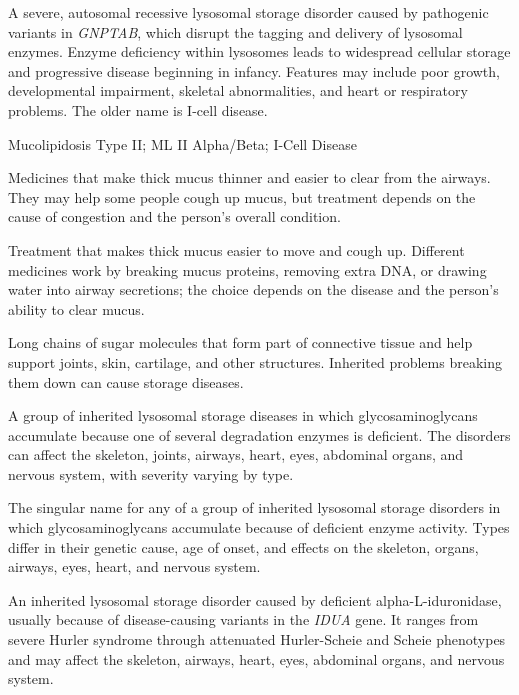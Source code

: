  A severe, autosomal recessive lysosomal
storage disorder caused by pathogenic variants in \textit{GNPTAB}, which
disrupt the tagging and delivery of lysosomal enzymes. Enzyme deficiency
within lysosomes leads to widespread cellular storage and progressive disease
beginning in infancy. Features may include poor growth, developmental
impairment, skeletal abnormalities, and heart or respiratory problems. The
older name is I-cell disease.

\synonyms
Mucolipidosis Type II; ML II Alpha/Beta; I-Cell Disease

 Medicines that make thick mucus thinner and easier to clear from the airways. They may help some people cough up mucus, but treatment depends on the cause of congestion and the person's overall condition.

 Treatment that makes thick mucus easier to move and cough up. Different medicines work by breaking mucus proteins, removing extra DNA, or drawing water into airway secretions; the choice depends on the disease and the person's ability to clear mucus.

 Long chains of sugar molecules that form part of connective tissue and help support joints, skin, cartilage, and other structures. Inherited problems breaking them down can cause storage diseases.

 A group of inherited lysosomal storage diseases in which glycosaminoglycans accumulate because one of several degradation enzymes is deficient. The disorders can affect the skeleton, joints, airways, heart, eyes, abdominal organs, and nervous system, with severity varying by type.

 The singular name for any of a group of inherited lysosomal storage disorders in which glycosaminoglycans accumulate because of deficient enzyme activity. Types differ in their genetic cause, age of onset, and effects on the skeleton, organs, airways, eyes, heart, and nervous system.

 An inherited lysosomal storage disorder caused by deficient alpha-L-iduronidase, usually because of disease-causing variants in the \textit{IDUA} gene. It ranges from severe Hurler syndrome through attenuated Hurler-Scheie and Scheie phenotypes and may affect the skeleton, airways, heart, eyes, abdominal organs, and nervous system.

